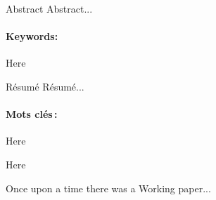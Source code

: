 \documentclass[gdpaper]{geradwp}
\begin{document}
	
	
	\GDpageCouverture
	
	\begin{GDpagetitre}
		
		\begin{GDauthlist}
		\end{GDauthlist}
		
		\begin{GDaffillist}
		\end{GDaffillist}
	
		\begin{GDemaillist}
		\end{GDemaillist}
	
	\end{GDpagetitre}


	\GDabstracts
	
	\begin{GDabstract}{Abstract}
		Abstract...
		
		\paragraph{Keywords: }
		Here
	\end{GDabstract}

	\begin{GDabstract}{R\'esum\'e}
		R\'esum\'e...
		
		\paragraph{Mots cl\'es\,: }
		Here
		
	\end{GDabstract}	
	
	
	\begin{GDacknowledgements}
		Here
		
	\end{GDacknowledgements}
	
	
	\GDarticlestart
	Once upon a time there was a Working paper...
\end{document}
